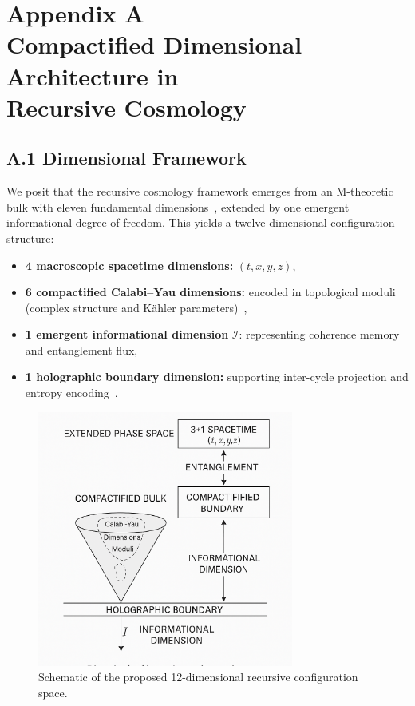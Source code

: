 \section*{Appendix A\\Compactified Dimensional Architecture in\\Recursive Cosmology}
\label{appendix:A}

\subsection*{A.1 Dimensional Framework}

We posit that the recursive cosmology framework emerges from an M-theoretic bulk with eleven fundamental dimensions~\cite{witten1995string, becker2007string}, extended by one emergent informational degree of freedom. This yields a twelve-dimensional configuration structure:

\begin{itemize}
  \item \textbf{4 macroscopic spacetime dimensions:} \( (t, x, y, z) \),
  \item \textbf{6 compactified Calabi–Yau dimensions:} encoded in topological moduli (complex structure and Kähler parameters)~\cite{candelas1985vacuum},
  \item \textbf{1 emergent informational dimension} \( \mathcal{I} \): representing coherence memory and entanglement flux,
  \item \textbf{1 holographic boundary dimension:} supporting inter-cycle projection and entropy encoding~\cite{ryu2006holographic}.
\end{itemize}

\begin{figure}[H]
\centering
\includegraphics[width=0.75\textwidth]{figures/12D_structure_diagram.png}
\caption{Schematic of the proposed 12-dimensional recursive configuration space.}
\label{fig:12D_structure}
\end{figure}

